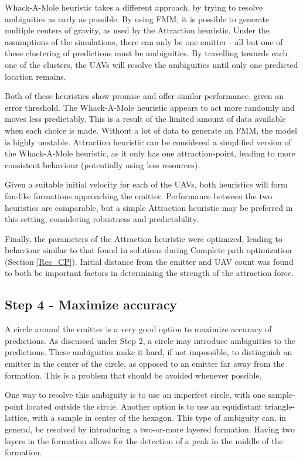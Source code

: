 \documentclass[10pt,a4paper]{book}
\begin{document}
Whack-A-Mole heuristic takes a different approach, by trying to resolve ambiguities as early as possible. By using \gls{FMM}, it is possible to generate multiple centers of gravity, as used by the Attraction heuristic. Under the assumptions of the simulations, there can only be one emitter - all but one of these clustering of predictions must be ambiguities. By travelling towards each one of the clusters, the \glspl{UAV} will resolve the ambiguities until only one predicted location remains.

Both of these heuristics show promise and offer similar performance, given an error threshold. The Whack-A-Mole heuristic appears to act more randomly and moves less predictably. This is a result of the limited amount of data available when each choice is made. Without a lot of data to generate an \gls{FMM}, the model is highly unstable. Attraction heuristic can be considered a simplified version of the Whack-A-Mole heuristic, as it only has one attraction-point, leading to more consistent behaviour (potentially using less resources).
 
Given a suitable initial velocity for each of the \glspl{UAV}, both heuristics will form fan-like formations approaching the emitter. Performance between the two heuristics are comparable, but a simple Attraction heuristic may be preferred in this setting, considering robustness and predictability. 

Finally, the parameters of the Attraction heuristic were optimized, leading to behaviour similar to that found in solutions during Complete path optimization (Section \ref{Res_CP}). Initial distance from the emitter and \gls{UAV} count was found to both be important factors in determining the strength of the attraction force.




\subsection{Step 4 - Maximize accuracy}

A circle around the emitter is a very good option to maximize accuracy of predictions. As discussed under Step 2, a circle may introduce ambiguities to the predictions. These ambiguities make it hard, if not impossible, to distinguish an emitter in the center of the circle, as opposed to an emitter far away from the formation. This is a problem that should be avoided whenever possible.

One way to resolve this ambiguity is to use an imperfect circle, with one sample-point located outside the circle. Another option is to use an equidistant triangle-lattice, with a sample in center of the hexagon. This type of ambiguity can, in general, be resolved by introducing a two-or-more layered formation. Having two layers in the formation allows for the detection of a peak in the middle of the formation. 
\end{document}
